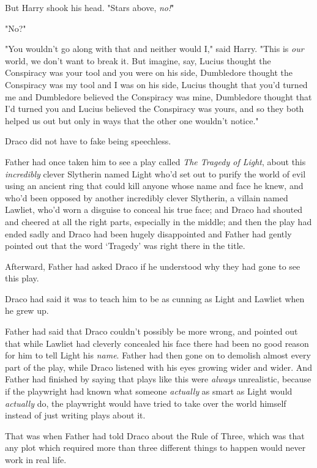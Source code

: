 But Harry shook his head. "Stars above, \emph{no!}"

"No\el?"

"You wouldn't go along with that and neither would I," said Harry. "This is
\emph{our} world, we don't want to break it. But imagine, say, Lucius thought
the Conspiracy was your tool and you were on his side, Dumbledore thought the
Conspiracy was my tool and I was on his side, Lucius thought that you'd turned
me and Dumbledore believed the Conspiracy was mine, Dumbledore thought that I'd
turned you and Lucius believed the Conspiracy was yours, and so they both
helped us out but only in ways that the other one wouldn't notice."

Draco did not have to fake being speechless.

Father had once taken him to see a play called \emph{The Tragedy of Light},
about this \emph{incredibly} clever Slytherin named Light who'd set out to
purify the world of evil using an ancient ring that could kill anyone whose
name and face he knew, and who'd been opposed by another incredibly clever
Slytherin, a villain named Lawliet, who'd worn a disguise to conceal his true
face; and Draco had shouted and cheered at all the right parts, especially in
the middle; and then the play had ended sadly and Draco had been hugely
disappointed and Father had gently pointed out that the word `Tragedy' was
right there in the title.

Afterward, Father had asked Draco if he understood why they had gone to see
this play.

Draco had said it was to teach him to be as cunning as Light and Lawliet when
he grew up.

Father had said that Draco couldn't possibly be more wrong, and pointed out
that while Lawliet had cleverly concealed his face there had been no good
reason for him to tell Light his \emph{name}. Father had then gone on to
demolish almost every part of the play, while Draco listened with his eyes
growing wider and wider. And Father had finished by saying that plays like this
were \emph{always} unrealistic, because if the playwright had known what
someone \emph{actually} as smart as Light would \emph{actually} do, the
playwright would have tried to take over the world himself instead of just
writing plays about it.

That was when Father had told Draco about the Rule of Three, which was that any
plot which required more than three different things to happen would never work
in real life.

